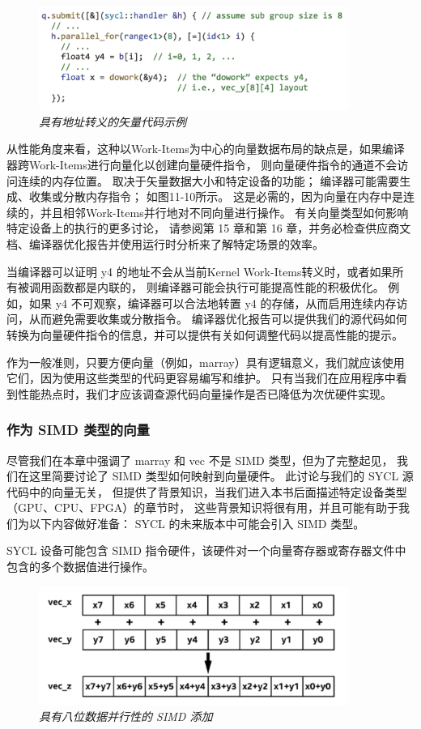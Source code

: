 \begin{figure}[H]
	\centering
	\includegraphics[width=0.9\textwidth]{figs/F11.10.png}
	\caption{\textit{具有地址转义的矢量代码示例 }}
\end{figure}

从性能角度来看，这种以Work-Items为中心的向量数据布局的缺点是，如果编译器跨Work-Items进行向量化以创建向量硬件指令，
则向量硬件指令的通道不会访问连续的内存位置。 取决于矢量数据大小和特定设备的功能； 
编译器可能需要生成、收集或分散内存指令； 
如图11-10所示。 这是必需的，因为向量在内存中是连续的，并且相邻Work-Items并行地对不同向量进行操作。 
有关向量类型如何影响特定设备上的执行的更多讨论，
请参阅第 15 章和第 16 章，并务必检查供应商文档、编译器优化报告并使用运行时分析来了解特定场景的效率。

当编译器可以证明 y4 的地址不会从当前Kernel Work-Items转义时，或者如果所有被调用函数都是内联的，
则编译器可能会执行可能提高性能的积极优化。 
例如，如果 y4 不可观察，编译器可以合法地转置 y4 的存储，从而启用连续内存访问，从而避免需要收集或分散指令。 
编译器优化报告可以提供我们的源代码如何转换为向量硬件指令的信息，并可以提供有关如何调整代码以提高性能的提示。

作为一般准则，只要方便向量（例如，marray）具有逻辑意义，我们就应该使用它们，因为使用这些类型的代码更容易编写和维护。 
只有当我们在应用程序中看到性能热点时，我们才应该调查源代码向量操作是否已降低为次优硬件实现。

\subsubsection{作为 SIMD 类型的向量}
尽管我们在本章中强调了 marray 和 vec 不是 SIMD 类型，但为了完整起见，
我们在这里简要讨论了 SIMD 类型如何映射到向量硬件。 
此讨论与我们的 SYCL 源代码中的向量无关，
但提供了背景知识，当我们进入本书后面描述特定设备类型（GPU、CPU、FPGA）的章节时，
这些背景知识将很有用，并且可能有助于我们为以下内容做好准备： SYCL 的未来版本中可能会引入 SIMD 类型。

SYCL 设备可能包含 SIMD 指令硬件，该硬件对一个向量寄存器或寄存器文件中包含的多个数据值进行操作。

\begin{figure}[H]
	\centering
	\includegraphics[width=0.9\textwidth]{figs/F11.11.png}
	\caption{\textit{具有八位数据并行性的 SIMD 添加 }}
\end{figure}

